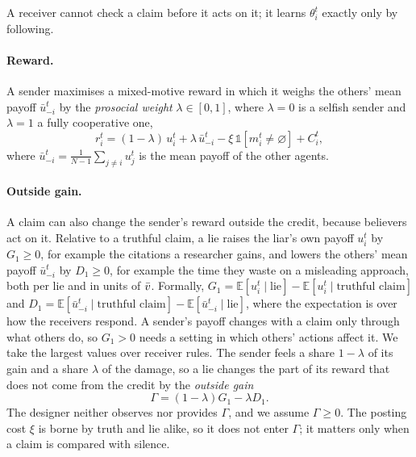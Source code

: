 A receiver cannot check a claim before it acts on it; it learns $\theta_i^t$ exactly only by following. 

\paragraph{Reward.}
A sender maximises a mixed-motive reward in which it weighs the others' mean payoff $\bar u_{-i}^t$ by the \emph{prosocial weight} $\lambda\in[0,1]$, where $\lambda=0$ is a selfish sender and $\lambda=1$ a fully cooperative one,
\begin{equation}
  r_i^t=(1-\lambda)\,u_i^t+\lambda\,\bar u_{-i}^t-\xi\,\mathbb 1[m_i^t\neq\varnothing]+C_i^t,
  \label{eq:reward}
\end{equation}
where $\bar u_{-i}^t=\frac1{N-1}\sum_{j\neq i}u_j^t$ is the mean payoff of the other agents.

\paragraph{Outside gain.}
A claim can also change the sender's reward outside the credit, because believers act on it. Relative to a truthful claim, a lie raises the liar's own payoff $u_i^t$ by $G_1\ge0$, for example the citations a researcher gains, and lowers the others' mean payoff $\bar u_{-i}^t$ by $D_1\ge0$, for example the time they waste on a misleading approach, both per lie and in units of $\bar v$. Formally, $G_1=\mathbb E[u_i^t\mid\text{lie}]-\mathbb E[u_i^t\mid\text{truthful claim}]$ and $D_1=\mathbb E[\bar u_{-i}^t\mid\text{truthful claim}]-\mathbb E[\bar u_{-i}^t\mid\text{lie}]$, where the expectation is over how the receivers respond. A sender's payoff changes with a claim only through what others do, so $G_1>0$ needs a setting in which others' actions affect it. We take the largest values over receiver rules. The sender feels a share $1-\lambda$ of its gain and a share $\lambda$ of the damage, so a lie changes the part of its reward that does not come from the credit by the \emph{outside gain}
\begin{equation}
  \Gamma=(1-\lambda)G_1-\lambda D_1 .
  \label{eq:gamma}
\end{equation}
The designer neither observes nor provides $\Gamma$, and we assume $\Gamma\ge0$. The posting cost $\xi$ is borne by truth and lie alike, so it does not enter $\Gamma$; it matters only when a claim is compared with silence.


